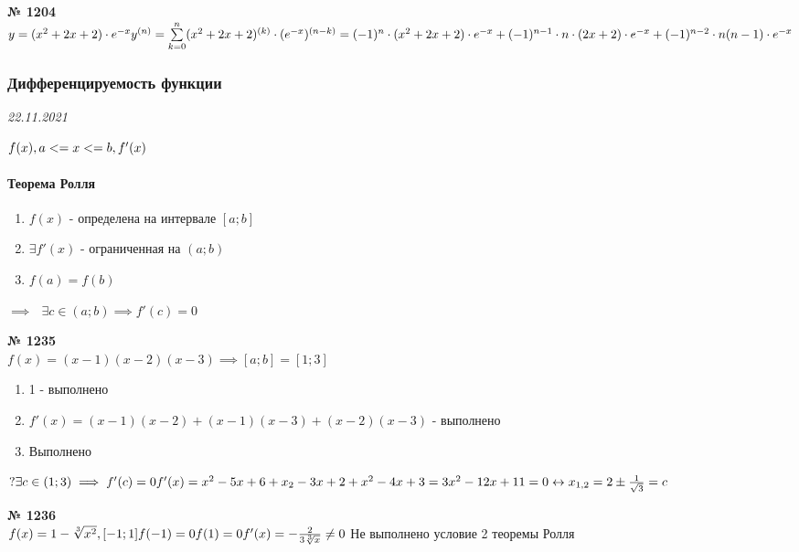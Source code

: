 \documentclass[12pt]{article}
\newenvironment{task}[1][0]{\vspace{.5cm} {\textbf{№ #1} \vspace{.5cm}\\ }\large}{}
\begin{document}
{\begin{task}[1204]
$y=(x^2+2x+2)\cdot e^{-x}\\
y^{(n)}=\sum\limits_{k=0}^n (x^2+2x+2)^{(k)} \cdot (e^{-x})^{(n-k)}=(-1)^n\cdot (x^2+2x+2) \cdot e^{-x} + (-1)^{n-1}\cdot n \cdot(2x+2)\cdot e^{-x} + (-1)^{n-2} \cdot n(n-1) \cdot e^{-x}$\\
\end{task}

\vspace{2cm}
\subsubsection{Дифференцируемость функции}
{\hfill \textit{22.11.2021}}

$f(x), a<=x<=b, f'(x)\\$
\paragraph{Теорема Ролля}
\begin{enumerate}
	\item{$f(x)$ - определена на интервале $[a; b]$}
	\item{$\exists f'(x)$ - ограниченная на $(a; b)$}
	\item{$f(a)=f(b)$}
\end{enumerate} $\implies \:\:\: \exists c\in(a; b) \implies f'(c)=0$

\begin{task}[1235]
$f(x)=(x-1)(x-2)(x-3) \implies [a; b]=[1;3]$
\begin{enumerate}
	\item 1 - выполнено
	\item $f'(x)=(x-1)(x-2)+(x-1)(x-3)+(x-2)(x-3)$ - выполнено
	\item Выполнено
\end{enumerate}

$? \exists c \in(1; 3) \implies f'(c)=0\\
f'(x)=x^2-5x+6+x_2-3x+2+x^2-4x+3=3x^2-12x+11=0 \leftrightarrow x_{1, 2}=2\pm \frac{1}{\sqrt{3}}=c$
\end{task}

\begin{task}[1236]
$f(x)=1-\sqrt[3]{x^2}, [-1; 1]\\
f(-1)=0\\
f(1)=0\\
f'(x)=-\frac{2}{3\sqrt[3]{x}} \neq 0\\
$
Не выполнено условие 2 теоремы Ролля
\end{task}

}
\end{document}
